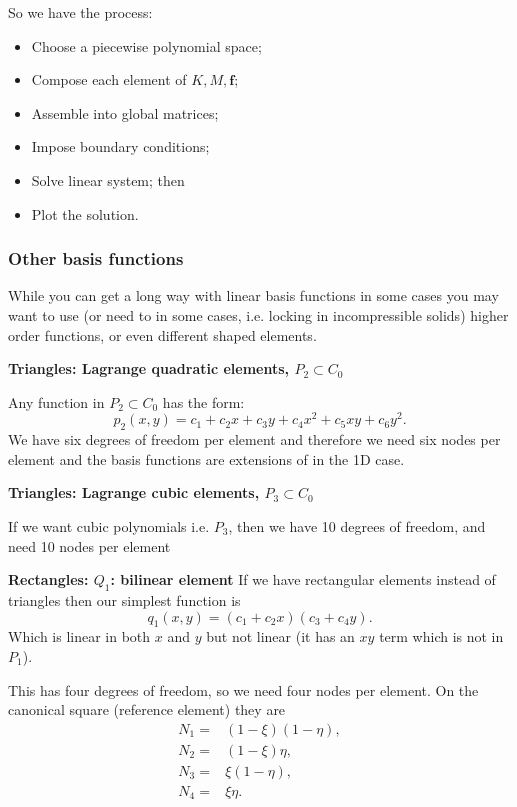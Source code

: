\documentclass[12pt, a4paper]{article}
\renewcommand{\vec}[1]{\mathbf{#1}}
\theoremstyle{definition}
\theoremstyle{remark}
\numberwithin{equation}{section}
\begin{document}
So we have the process:
\begin{itemize}
\item Choose a piecewise polynomial space;
\item Compose each element of $K,M,\vec{f}$;
\item Assemble into global matrices;
\item Impose boundary conditions;
\item Solve linear system; then
\item Plot the solution.
\end{itemize}

\newpage
\subsubsection{Other basis functions}

While you can get a long way with linear basis functions in some cases you may want to use (or need to in some cases, i.e. locking in incompressible solids) higher order functions, or even different shaped elements.

\vspace{0.5cm}
{\bf Triangles: Lagrange quadratic elements, $P_2 \subset C_0$}

Any function in $P_2 \subset C_0$ has the form:
\begin{equation*}
p_2(x,y) = c_1+c_2x+c_3y+c_4x^2+c_5xy+c_6y^2.
\end{equation*}
We have six degrees of freedom per element and therefore we need six nodes per element and the basis functions are extensions of in the 1D case.



\vspace{0.5cm}
{\bf Triangles: Lagrange cubic elements, $P_3 \subset C_0$}

If we want cubic polynomials i.e. $P_3$, then we have 10 degrees of freedom, and need 10 nodes per element


\vspace{0.5cm}
{\bf Rectangles:  $Q_1$: bilinear element}
If we have rectangular elements instead of triangles then our simplest function is
\begin{equation*}
q_1(x,y)=(c_1+c_2x)(c_3+c_4y).
\end{equation*}
Which is linear in both $x$ and $y$ but not linear (it has an $xy$ term which is not in $P_1$).

This has four degrees of freedom, so we need four nodes per  element. On the canonical square (reference element) they are 
\begin{align*}
N_1=&(1-\xi)(1-\eta),\\
N_2=&(1-\xi)\eta,\\
N_3=&\xi(1-\eta),\\
N_4=&\xi\eta.
\end{align*}
\end{document}
